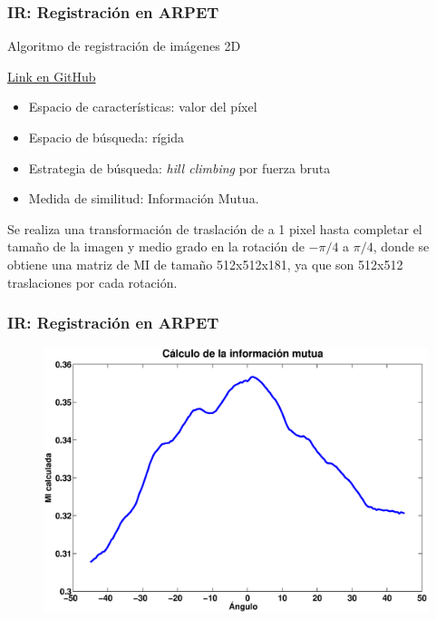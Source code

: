\documentclass{beamer} %
\begin{document}
\begin{frame}
\frametitle{IR: Registración en ARPET}

Algoritmo de registración de imágenes 2D

\href{https://github.com/ahestevenz/ip-image-registration}{Link en GitHub}

\begin{itemize}
\pause
\item Espacio de características: valor del píxel
\pause
\item Espacio de búsqueda: rígida
\pause
\item Estrategia de búsqueda: \textit{hill climbing} por fuerza bruta
\pause
\item Medida de similitud: Información Mutua.
\end{itemize}

\pause
\begin{block}{}
  Se realiza una transformación de traslación de a 1 pixel hasta completar el tamaño de la imagen y medio grado en la rotación de $-\pi/4$ a $\pi/4$, donde se obtiene una matriz de MI de tamaño 512x512x181, ya que son 512x512 traslaciones por cada rotación.
\end{block}

\end{frame}

\begin{frame}
\frametitle{IR: Registración en ARPET}

\begin{figure}
  \includegraphics[width=\textwidth]{images/calc_mi_matrix_rotation.eps}
\end{figure}

\end{frame}
\end{document}
